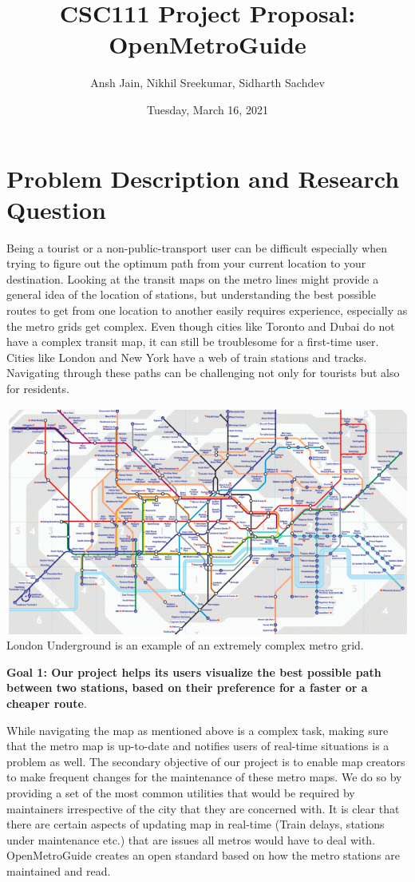 \documentclass[fontsize=11pt]{article}
\title{CSC111 Project Proposal: OpenMetroGuide}
\author{Ansh Jain, Nikhil Sreekumar, Sidharth Sachdev}
\date{Tuesday, March 16, 2021}
\begin{document}
\maketitle

\section*{Problem Description and Research Question}

Being a tourist or a non-public-transport user can be difficult especially when trying to figure out the optimum path from your current location to your destination. Looking at the transit maps on the metro lines might provide a general idea of the location of stations, but understanding the best possible routes to get from one location to another easily requires experience, especially as the metro grids get complex. Even though cities like Toronto and Dubai do not have a complex transit map, it can still be troublesome for a first-time user. Cities like London and New York have a web of train stations and tracks. Navigating through these paths can be challenging not only for tourists but also for residents.\newline


\begin{center}
	\includegraphics[width = 14cm]{London Transit Map.png}\newline
	London Underground is an example of an extremely complex metro grid.
\end{center}

\textbf{Goal 1: Our project helps its users visualize the best possible path between two stations, based on their preference for a faster or a cheaper route}.\newline 

While navigating the map as mentioned above is a complex task, making sure that the metro map is up-to-date and notifies users of real-time situations is a problem as well. The secondary objective of our project is to enable map creators to make frequent changes for the maintenance of these metro maps. We do so by providing a set of the most common utilities that would be required by maintainers irrespective of the city that they are concerned with. It is clear that there are certain aspects of updating map in real-time (Train delays, stations under maintenance etc.) that are issues all metros would have to deal with. OpenMetroGuide creates an open standard  based on how the metro stations are maintained and read.\newline
\end{document}
